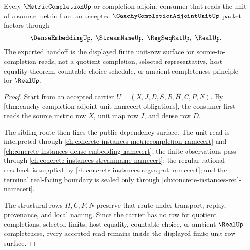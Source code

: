 \begin{theorem}
\label{thm:cauchy-completion-adjoint-unit-handoff}
Every $\MetricCompletionUp$ or completion-adjoint consumer that reads the unit of a source metric from an accepted $\CauchyCompletionAdjointUnitUp$ packet factors through
$$
\DenseEmbeddingUp,\ \StreamNameUp,\ \RegSeqRatUp,\ \RealUp .
$$
The exported handoff is the displayed finite unit-row surface for source-to-completion reads, not a quotient completion, selected representative, host equality theorem, countable-choice schedule, or ambient completeness principle for $\RealUp$.
\end{theorem}
\begin{proof}
Start from an accepted carrier $U=(X,J,D,S,R,H,C,P,N)$. By \autoref{thm:cauchy-completion-adjoint-unit-namecert-obligations}, the consumer first reads the source metric row $X$, unit map row $J$, and dense row $D$.

The sibling route then fixes the public dependency surface. The unit read is interpreted through \autoref{ch:concrete-instances-metriccompletion-namecert} and \autoref{ch:concrete-instances-dense-embedding-namecert}; the finite observations pass through \autoref{ch:concrete-instances-streamname-namecert}; the regular rational readback is supplied by \autoref{ch:concrete-instances-regseqrat-namecert}; and the terminal real-facing boundary is sealed only through \autoref{ch:concrete-instances-real-namecert}.

The structural rows $H,C,P,N$ preserve that route under transport, replay, provenance, and local naming. Since the carrier has no row for quotient completions, selected limits, host equality, countable choice, or ambient $\RealUp$ completeness, every accepted read remains inside the displayed finite unit-row surface.
\end{proof}



